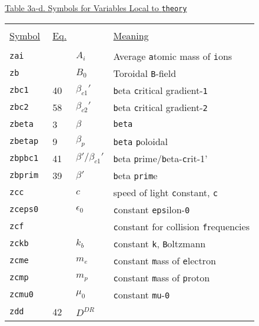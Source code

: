 \begin{table}
\begin{center}
\underline{Table 3a-d.  Symbols for Variables Local to {\tt theory}}

\begin{tabular}{lllp{}}
 & & & \\
\underline{Symbol} & \underline{Eq.} &    & \underline{Meaning} \\
 & & & \\
{\tt zai   } &    & $A_{i}$
                    & Average {\tt a}tomic mass of {\tt i}ons    \\
{\tt zb    } &    & $B_{0}$
                    & Toroidal {\tt B}-field                     \\
{\tt zbc1  } & 40 & $\beta_{c1}'$
                    & {\tt b}eta {\tt c}ritical gradient-{\tt 1} \\
{\tt zbc2  } & 58 & $\beta_{c2}'$
                    & {\tt b}eta {\tt c}ritical gradient-{\tt 2} \\
{\tt zbeta } &  3 & $\beta$
                    & {\tt beta}                                 \\
{\tt zbetap} &  9 & $\beta_{p}$
                    & {\tt beta} {\tt p}oloidal                  \\
{\tt zbpbc1} & 41 & $\beta '/\beta_{c1}'$
                    & {\tt b}eta {\tt p}rime/{\tt b}eta-{\tt c}rit-1' \\
{\tt zbprim} & 39 & $\beta '$
                    & {\tt b}eta {\tt prim}e                      \\
{\tt zcc   } &    & $c$
                    & speed of light {\tt c}onstant, {\tt c}      \\
{\tt zceps0 } &    & $\epsilon_{0}$
                    & {\tt c}onstant {\tt eps}ilon-{\tt 0}        \\
{\tt zcf   } &    &
                    & {\tt c}onstant for collision {\tt f}requencies \\
{\tt zckb  } &    & $k_{b}$
                    & {\tt c}onstant {\tt k}, {\tt B}oltzmann     \\
{\tt zcme  } &    & $m_{e}$
                    & {\tt c}onstant {\tt m}ass of {\tt e}lectron \\
{\tt zcmp  } &    & $m_{p}$
                    & {\tt c}onstant {\tt m}ass of {\tt p}roton   \\
{\tt zcmu0 } &    & $\mu_{0}$
                    & {\tt c}onstant {\tt mu}-{\tt 0}             \\
{\tt zdd   } & 42 & $D^{DR}$

\end{tabular}
\end{center}
\end{table}
